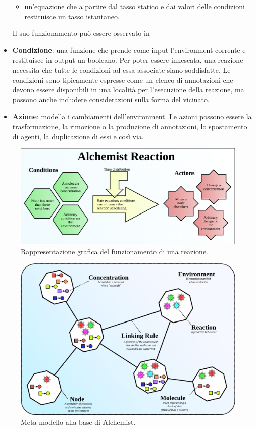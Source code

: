\documentclass[12pt,a4paper,openright,twoside]{book}
\begin{document}
\begin{itemize}
\begin{itemize}
        \item un'equazione che a partire dal tasso statico e dai valori delle condizioni restituisce un tasso istantaneo.
    \end{itemize}
    Il suo funzionamento può essere osservato in~
    \item \textbf{Condizione}: una funzione che prende come input l'environment corrente e restituisce in output un booleano. Per poter essere innescata, una reazione necessita che tutte le condizioni ad essa associate siano soddisfatte. Le condizioni sono tipicamente espresse come un elenco di annotazioni che devono essere disponibili in una località per l'esecuzione della reazione, ma possono anche includere considerazioni sulla forma del vicinato.
    \item \textbf{Azione}: modella i cambiamenti dell'environment. Le azioni possono essere la trasformazione, la rimozione o la produzione di annotazioni, lo spostamento di agenti, la duplicazione di essi e così via.
\end{itemize}

\begin{figure}
    \centering
    \includegraphics[width=.85\linewidth]{figures/discrete-event-simulation/alchemist-reaction.png}
    \caption{Rappresentazione grafica del funzionamento di una reazione.}
    \label{fig:alchemist-reaction}
\end{figure}

\begin{figure}
    \centering
    \includegraphics[width=.85\linewidth]{figures/discrete-event-simulation/alchemist-model.png}
    \caption{Meta-modello alla base di Alchemist.}
    \label{fig:alchemist-model}
\end{figure}
\end{document}
